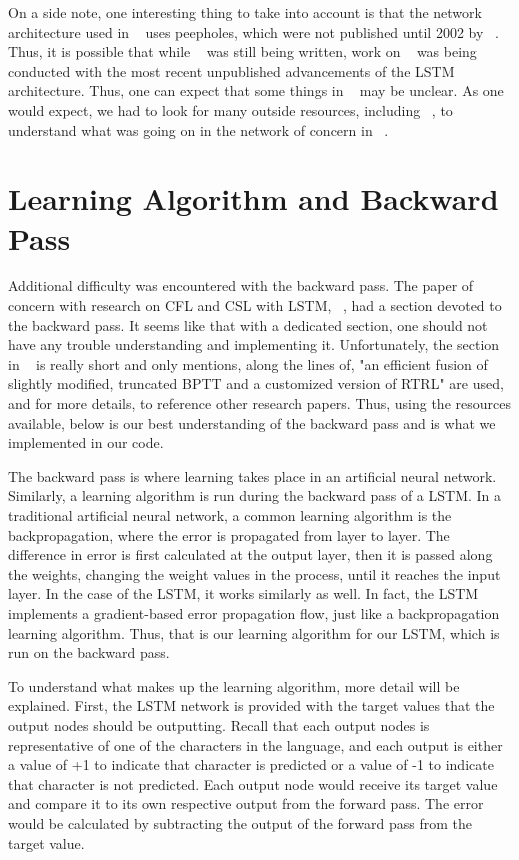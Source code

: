 \documentclass[11pt,letterpaper]{article}
\begin{document}
	On a side note, one interesting thing to take into account is that the network architecture used in ~\cite{Gers:01} uses peepholes, which were not published until 2002 by ~\cite{Gers:02}. Thus, it is possible that while ~\cite{Gers:02} was still being written, work on ~\cite{Gers:01} was being conducted with the most recent unpublished advancements of the LSTM architecture. Thus, one can expect that some things in ~\cite{Gers:01} may be unclear. As one would expect, we had to look for many outside resources, including ~\cite{Gers:02}, to understand what was going on in the network of concern in ~\cite{Gers:01}.

	\section{Learning Algorithm and Backward Pass}
	Additional difficulty was encountered with the backward pass. The paper of concern with research on CFL and CSL with LSTM, ~\cite{Gers:01}, had a section devoted to the backward pass. It seems like that with a dedicated section, one should not have any trouble understanding and implementing it. Unfortunately, the section in ~\cite{Gers:01} is really short and only mentions, along the lines of, "an efficient fusion of slightly modified, truncated BPTT and a customized version of RTRL" are used, and for more details, to reference other research papers. Thus, using the resources available, below is our best understanding of the backward pass and is what we implemented in our code.

	The backward pass is where learning takes place in an artificial neural network. Similarly, a learning algorithm is run during the backward pass of a LSTM. In a traditional artificial neural network, a common learning algorithm is the backpropagation, where the error is propagated from layer to layer. The difference in error is first calculated at the output layer, then it is passed along the weights, changing the weight values in the process, until it reaches the input layer. In the case of the LSTM, it works similarly as well. In fact, the LSTM implements a gradient-based error propagation flow, just like a backpropagation learning algorithm. Thus, that is our learning algorithm for our LSTM, which is run on the backward pass.

	To understand what makes up the learning algorithm, more detail will be explained. First, the LSTM network is provided with the target values that the output nodes should be outputting. Recall that each output nodes is representative of one of the characters in the language, and each output is either a value of +1 to indicate that character is predicted or a value of -1 to indicate that character is not predicted. Each output node would receive its target value and compare it to its own respective output from the forward pass. The error would be calculated by subtracting the output of the forward pass from the target value.
\end{document}
